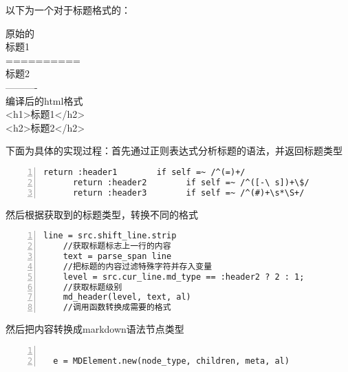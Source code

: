 以下为一个对于标题格式的：

\begin{bframe}
  原始的\\
         标题1\\
         ==========\\
         标题2\\
         ----------  \\
 编译后的html格式\\
        <h1>标题1</h2>\\
        <h2>标题2</h2>\\
\end{bframe}

下面为具体的实现过程：首先通过正则表达式分析标题的语法，并返回标题类型

\begin{lstlisting}[language={[ANSI]C}, numbers=left, numberstyle=\tiny, keywordstyle=\color{blue!70}, commentstyle=\color{red!50!green!50!blue!50}, frame=shadowbox, rulesepcolor=\color{red!20!green!20!blue!20}]
      return :header1        if self =~ /^(=)+/
      return :header2        if self =~ /^([-\ s])+\$/
      return :header3        if self =~ /^(#)+\s*\S+/

\end{lstlisting}

然后根据获取到的标题类型，转换不同的格式

\begin{lstlisting}[language={[ANSI]C}, numbers=left, numberstyle=\tiny, keywordstyle=\color{blue!70}, commentstyle=\color{red!50!green!50!blue!50}, frame=shadowbox, rulesepcolor=\color{red!20!green!20!blue!20}]
    line = src.shift_line.strip
    //获取标题标志上一行的内容
    text = parse_span line
    //把标题的内容过滤特殊字符并存入变量
    level = src.cur_line.md_type == :header2 ? 2 : 1;
    //获取标题级别
    md_header(level, text, al)
    //调用函数转换成需要的格式

\end{lstlisting}

然后把内容转换成markdown语法节点类型

\begin{lstlisting}[language={[ANSI]C}, numbers=left, numberstyle=\tiny, keywordstyle=\color{blue!70}, commentstyle=\color{red!50!green!50!blue!50}, frame=shadowbox, rulesepcolor=\color{red!20!green!20!blue!20}]

  e = MDElement.new(node_type, children, meta, al)

\end{lstlisting}


